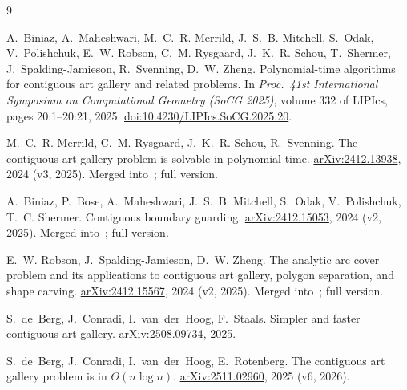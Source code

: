 \documentclass[11pt,a4paper]{article}
\begin{document}
\begin{thebibliography}{9}

A.~Biniaz, A.~Maheshwari, M.~C.~R. Merrild, J.~S.~B. Mitchell, S.~Odak, V.~Polishchuk, E.~W. Robson, C.~M. Rysgaard, J.~K.~R. Schou, T.~Shermer,
J.~Spalding-Jamieson, R.~Svenning, D.~W. Zheng.
\newblock Polynomial-time algorithms for contiguous art gallery and related problems.
\newblock In \emph{Proc.\ 41st International Symposium on Computational Geometry (SoCG 2025)}, volume 332 of LIPIcs, pages 20:1--20:21, 2025.
\newblock \href{https://doi.org/10.4230/LIPIcs.SoCG.2025.20}{doi:10.4230/LIPIcs.SoCG.2025.20}.

M.~C.~R. Merrild, C.~M. Rysgaard, J.~K.~R. Schou, R.~Svenning.
\newblock The contiguous art gallery problem is solvable in polynomial time.
\newblock \href{https://arxiv.org/abs/2412.13938}{arXiv:2412.13938}, 2024 (v3, 2025). Merged into~\cite{Biniaz2025}; full version.

A.~Biniaz, P.~Bose, A.~Maheshwari, J.~S.~B. Mitchell, S.~Odak, V.~Polishchuk, T.~C. Shermer.
\newblock Contiguous boundary guarding.
\newblock \href{https://arxiv.org/abs/2412.15053}{arXiv:2412.15053}, 2024 (v2, 2025). Merged into~\cite{Biniaz2025}; full version.

E.~W. Robson, J.~Spalding-Jamieson, D.~W. Zheng.
\newblock The analytic arc cover problem and its applications to contiguous art gallery, polygon separation, and shape carving.
\newblock \href{https://arxiv.org/abs/2412.15567}{arXiv:2412.15567}, 2024 (v2, 2025). Merged into~\cite{Biniaz2025}; full version.

S.~de~Berg, J.~Conradi, I.~van~der~Hoog, F.~Staals.
\newblock Simpler and faster contiguous art gallery.
\newblock \href{https://arxiv.org/abs/2508.09734}{arXiv:2508.09734}, 2025.

S.~de~Berg, J.~Conradi, I.~van~der~Hoog, E.~Rotenberg.
\newblock The contiguous art gallery problem is in $\Theta(n\log n)$.
\newblock \href{https://arxiv.org/abs/2511.02960}{arXiv:2511.02960}, 2025 (v6, 2026).

\end{thebibliography}
\end{document}
